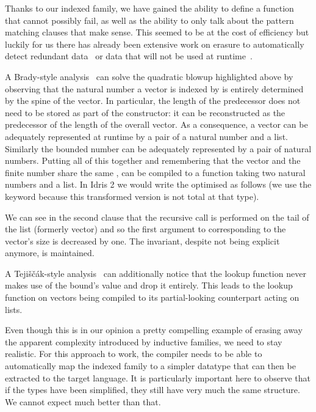 \documentclass{article}
\newcommand{\idris}{Idris 2}
\begin{document}
Thanks to our indexed family, we have gained the ability to define a function that cannot
possibly fail, as well as the ability to only talk about the pattern matching clauses
that make sense.
This seemed to be at the cost of efficiency but luckily for us there has already been
extensive work on erasure to automatically detect redundant
data~\cite{DBLP:conf/types/BradyMM03} or data that will not be used at
runtime~\cite{DBLP:journals/pacmpl/Tejiscak20}.

A Brady-style analysis~\cite{DBLP:conf/types/BradyMM03}
can solve the quadratic blowup highlighted above by observing
that the natural number a vector is indexed by is entirely determined by the spine of
the vector. In particular, the length of the predecessor does not need to be stored
as part of the constructor: it can be reconstructed as the predecessor of the length
of the overall vector. As a consequence, a vector can be adequately represented at
runtime by a pair of a natural number and a list. Similarly the bounded number can be
adequately represented by a pair of natural numbers. Putting all of this together and
remembering that the vector and the finite number share the same ,
 can be compiled to a function taking two natural numbers and a list.
In \idris{} we would write the optimised  as follows (we use the
 keyword because this transformed version is not total at that type).


We can see in the second clause that the recursive call is performed on the tail of
the list (formerly vector) and so the first argument to 
corresponding to the vector's size is decreased by one. The invariant, despite not
being explicit anymore, is maintained.

A Tejiščák-style analysis~\cite{DBLP:journals/pacmpl/Tejiscak20} can additionally
notice that the lookup function never makes
use of the bound's value and drop it entirely. This leads to the lookup function on
vectors being compiled to its partial-looking counterpart acting on lists.


Even though this is in our opinion a pretty compelling example of erasing away the
apparent complexity introduced by inductive families, we need to stay
realistic.
%
For this approach to work, the compiler needs to be able to automatically map the
indexed family to a simpler datatype that can then be extracted to the target language.
%
It is particularly important here to observe that if the types have been simplified,
they still have very much the same structure. We cannot expect much better than that.
\end{document}
